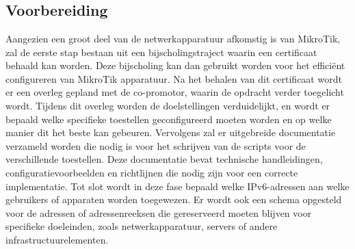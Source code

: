 
\chapter{}%
\label{ch:methodologie}


\section{Voorbereiding}
\label{sec:voorbereiding}

Aangezien een groot deel van de netwerkapparatuur afkomstig is van MikroTik, zal de eerste stap bestaan uit een bijscholingstraject waarin een certificaat behaald kan worden.
Deze bijscholing kan dan gebruikt worden voor het efficiënt configureren van MikroTik apparatuur.
Na het behalen van dit certificaat wordt er een overleg gepland met de co-promotor, waarin de opdracht verder toegelicht wordt. 
Tijdens dit overleg worden de doelstellingen verduidelijkt, en wordt er bepaald welke specifieke toestellen geconfigureerd moeten worden en op welke manier dit het beste kan gebeuren. 
Vervolgens zal er uitgebreide documentatie verzameld worden die nodig is voor het schrijven van de scripts voor de verschillende toestellen. 
Deze documentatie bevat technische handleidingen, configuratievoorbeelden en richtlijnen die nodig zijn voor een correcte implementatie. 
Tot slot wordt in deze fase bepaald welke IPv6-adressen aan welke gebruikers of apparaten worden toegewezen. 
Er wordt ook een schema opgesteld voor de adressen of adressenreeksen die gereserveerd moeten blijven voor specifieke doeleinden, zoals netwerkapparatuur, 
servers of andere infrastructuurelementen.

